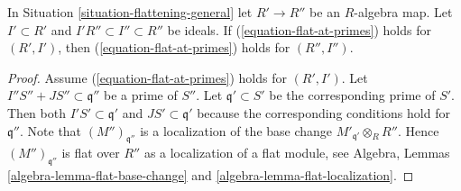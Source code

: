 \begin{lemma}
\label{lemma-base-change-flat-at-primes}
In Situation \ref{situation-flattening-general}
let $R' \to R''$ be an $R$-algebra map.
Let $I' \subset R'$ and $I'R'' \subset I'' \subset R''$ be ideals.
If (\ref{equation-flat-at-primes}) holds for
$(R', I')$, then (\ref{equation-flat-at-primes})
holds for $(R'', I'')$.
\end{lemma}

\begin{proof}
Assume (\ref{equation-flat-at-primes}) holds for $(R', I')$.
Let $I''S'' + JS'' \subset \mathfrak q''$ be a prime of $S''$.
Let $\mathfrak q' \subset S'$ be the corresponding prime of $S'$.
Then both $I'S' \subset \mathfrak q'$ and $JS' \subset \mathfrak q'$
because the corresponding conditions hold for $\mathfrak q''$.
Note that $(M'')_{\mathfrak q''}$
is a localization of the base change $M'_{\mathfrak q'} \otimes_R R''$.
Hence $(M'')_{\mathfrak q''}$ is flat over $R''$ as a localization
of a flat module, see
Algebra, Lemmas \ref{algebra-lemma-flat-base-change} and
\ref{algebra-lemma-flat-localization}.
\end{proof}
